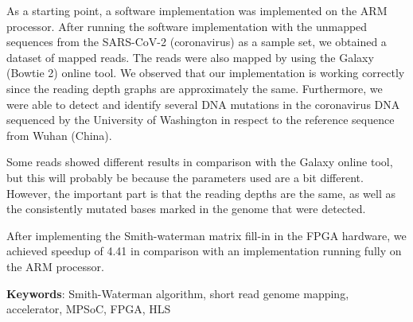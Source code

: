 As a starting point, a software implementation was implemented on the ARM processor. After running the software implementation with the unmapped sequences from the SARS-CoV-2 (coronavirus) as a sample set, we obtained a dataset of mapped reads. The reads were also mapped by using the Galaxy (Bowtie 2) online tool. We observed that our implementation is working correctly since the reading depth graphs are approximately the same. Furthermore, we were able to detect and identify several DNA mutations in the coronavirus DNA sequenced by the University of Washington in respect to the reference sequence from Wuhan (China).

Some reads showed different results in comparison with the Galaxy online tool, but this will probably be because the parameters used are a bit different. However, the important part is that the reading depths are the same, as well as the consistently mutated bases marked in the genome that were detected.

After implementing the Smith-waterman matrix fill-in in the FPGA hardware, we achieved speedup of 4.41 in comparison with an implementation running fully on the ARM processor.

\textbf{Keywords}: Smith-Waterman algorithm, short read genome mapping, accelerator, MPSoC, FPGA, HLS
